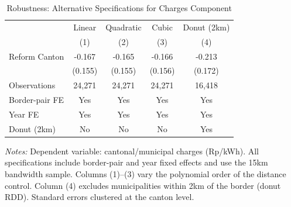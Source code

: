 \begin{table}[htbp]
\centering
\caption{Robustness: Alternative Specifications for Charges Component}
\label{tab:robustness}
\begin{tabular}{lcccc}
\toprule
 & Linear & Quadratic & Cubic & Donut (2km) \\
 & (1) & (2) & (3) & (4) \\
\midrule
Reform Canton & -0.167 & -0.165 & -0.166 & -0.213 \\
 & (0.155) & (0.155) & (0.156) & (0.172) \\
\midrule
Observations & 24,271 & 24,271 & 24,271 & 16,418 \\
Border-pair FE & Yes & Yes & Yes & Yes \\
Year FE & Yes & Yes & Yes & Yes \\
Donut (2km) & No & No & No & Yes \\
\bottomrule
\end{tabular}
\begin{tablenotes}[flushleft]
\small
\item \textit{Notes:} Dependent variable: cantonal/municipal charges (Rp/kWh). All specifications include border-pair and year fixed effects and use the 15km bandwidth sample. Columns (1)--(3) vary the polynomial order of the distance control. Column (4) excludes municipalities within 2km of the border (donut RDD). Standard errors clustered at the canton level.
\end{tablenotes}
\end{table}
